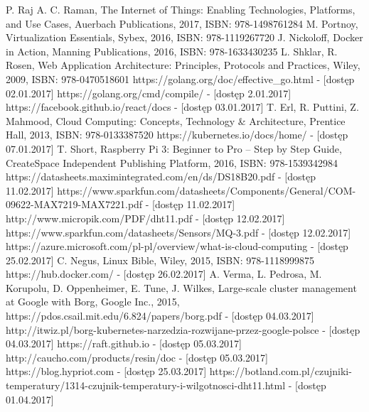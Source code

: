 \documentclass[12pt]{report}
\begin{document}
{
\begin{thebibliography}{99}
	 {P. Raj A. C. Raman, The Internet of Things: Enabling Technologies, Platforms, and Use Cases, Auerbach Publications, 2017, ISBN: 978-1498761284}
	 {M. Portnoy, Virtualization Essentials, Sybex, 2016, ISBN: 978-1119267720}
	 {J. Nickoloff, Docker in Action, Manning Publications, 2016, ISBN: 978-1633430235} 
	 {L. Shklar, R. Rosen, Web Application Architecture: Principles, Protocols and Practices, Wiley, 2009, ISBN: 978-0470518601}
	 {https://golang.org/doc/effective\_go.html - [dostęp 02.01.2017]}
	 {https://golang.org/cmd/compile/ - [dostęp 2.01.2017]}
	 {https://facebook.github.io/react/docs - [dostęp 03.01.2017]}
	 {T. Erl, R. Puttini, Z. Mahmood, Cloud Computing: Concepts, Technology \& Architecture, Prentice Hall, 2013, ISBN: 978-0133387520}
	 {https://kubernetes.io/docs/home/ - [dostęp 07.01.2017]}	
	 {T. Short, Raspberry Pi 3: Beginner to Pro – Step by Step Guide, CreateSpace Independent Publishing Platform, 2016, ISBN: 978-1539342984}
	 {https://datasheets.maximintegrated.com/en/ds/DS18B20.pdf - [dostęp 11.02.2017]}
	 {https://www.sparkfun.com/datasheets/Components/General/COM-09622-MAX7219-MAX7221.pdf - [dostęp 11.02.2017]}
	 {http://www.micropik.com/PDF/dht11.pdf - [dostęp 12.02.2017]}
	 {https://www.sparkfun.com/datasheets/Sensors/MQ-3.pdf - [dostęp 12.02.2017]}
	 {https://azure.microsoft.com/pl-pl/overview/what-is-cloud-computing - [dostęp 25.02.2017]}
	 {C. Negus, Linux Bible, Wiley, 2015, ISBN: 978-1118999875}
	 {https://hub.docker.com/ - [dostęp 26.02.2017]}
	 {A. Verma, L. Pedrosa, M. Korupolu, D. Oppenheimer, E. Tune, J. Wilkes, Large-scale cluster management at Google with Borg, Google Inc., 2015, https://pdos.csail.mit.edu/6.824/papers/borg.pdf - [dostęp 04.03.2017]}
	 {http://itwiz.pl/borg-kubernetes-narzedzia-rozwijane-przez-google-polsce - [dostęp 04.03.2017]}
	 {https://raft.github.io - [dostęp 05.03.2017]}
	 {http://caucho.com/products/resin/doc - [dostęp 05.03.2017]}
	 {https://blog.hypriot.com - [dostęp 25.03.2017]}
	 {https://botland.com.pl/czujniki-temperatury/1314-czujnik-temperatury-i-wilgotnosci-dht11.html - [dostęp 01.04.2017]}

\end{thebibliography}}
\end{document}
